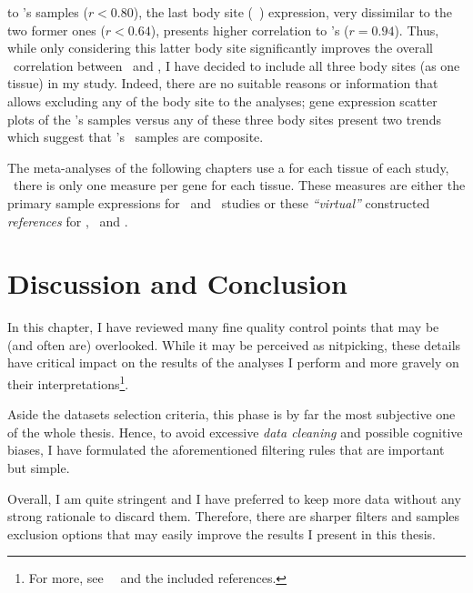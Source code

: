 \begin{itemize}[topsep=0pt,nosep]
            to \uhlen{}'s  samples ($r < 0.80$),
            the last body site (\ie\ ) expression,
            very dissimilar to the two former ones ($r < 0.64$),
            presents higher correlation to \uhlen's ($r = 0.94$).
            Thus, while only considering this latter body site significantly improves
            the overall \oesophagus\ correlation between \gtex\ and \uhlen,
            I have decided to include all three body sites (as one tissue)
            in my study.
            Indeed, there are no suitable reasons or information that allows excluding
            any of the body site  to the analyses;
            gene expression scatter plots of the \uhlen{}'s samples versus
            any of these three body sites present two trends which suggest that
            \uhlen{}'s \oesophagus\ samples are composite.

\end{itemize}

The meta-analyses of the following chapters use
a  for each tissue of each study, \ie\
there is only one measure per gene for each tissue.
These measures\label{def:trep} are either
the primary sample expressions for \castle\ and \ibm\ studies or
these \emph{\enquote{virtual}} constructed \emph{references}
for \brawand, \uhlen\ and \gtex.\mybr\



\section{Discussion and Conclusion}

In this chapter, I have reviewed many fine quality control points that
may be (and often are) overlooked.
While it may be perceived as nitpicking,
these details have critical impact on the results of the analyses
I perform and more gravely on their interpretations\footnote{%
For more, see~~
and the included references.}.\mybr\

Aside the datasets selection criteria,
this phase is by far the most subjective one of the whole thesis.
Hence, to avoid excessive \emph{data cleaning}
and possible cognitive biases,
I have formulated the aforementioned filtering rules
that are important but simple.\mybr\

Overall, I am quite stringent and I have preferred to keep more data
without any strong rationale to discard them.
Therefore, there are sharper filters and samples exclusion options that
may easily improve the results I present in this thesis.\mybr\


